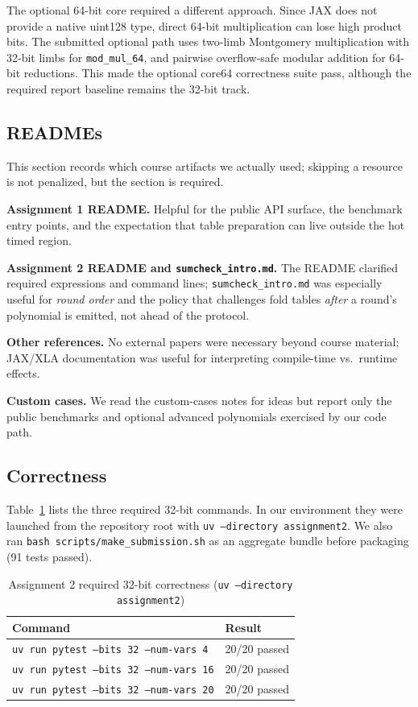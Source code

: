 \documentclass[conference]{IEEEtran}
\begin{document}
The optional 64-bit core required a different approach. Since JAX does not
provide a native uint128 type, direct 64-bit multiplication can lose high
product bits. The submitted optional path uses two-limb Montgomery
multiplication with 32-bit limbs for \texttt{mod\_mul\_64}, and pairwise
overflow-safe modular addition for 64-bit reductions. This made the optional
core64 correctness suite pass, although the required report baseline remains
the 32-bit track.

\subsection{READMEs}
This section records which course artifacts we actually used; skipping a
resource is not penalized, but the section is required.

\textbf{Assignment 1 README.} Helpful for the public API surface, the benchmark
entry points, and the expectation that table preparation can live outside the
hot timed region.

\textbf{Assignment 2 README and \texttt{sumcheck\_intro.md}.} The README
clarified required expressions and command lines; \texttt{sumcheck\_intro.md}
was especially useful for \emph{round order} and the policy that challenges
fold tables \emph{after} a round's polynomial is emitted, not ahead of the
protocol.

\textbf{Other references.} No external papers were necessary beyond course
material; JAX/XLA documentation was useful for interpreting compile-time vs.\
runtime effects.

\textbf{Custom cases.} We read the custom-cases notes for ideas but report only
the public benchmarks and optional advanced polynomials exercised by our code
path.

\subsection{Correctness}
Table~\ref{tab:a2-correctness} lists the three required 32-bit commands. In our
environment they were launched from the repository root with
\texttt{uv --directory assignment2}. We also ran \texttt{bash scripts/make\_submission.sh}
as an aggregate bundle before packaging (91 tests passed).

\begin{table}[htbp]
\caption{Assignment 2 required 32-bit correctness (\texttt{uv --directory assignment2})}
\label{tab:a2-correctness}
\centering
\footnotesize
\setlength{\tabcolsep}{4pt}
\begin{tabularx}{\columnwidth}{@{}>{\raggedright\arraybackslash}X l@{}}
\toprule
Command & Result \\
\midrule
\texttt{uv run pytest --bits 32 --num-vars 4} & 20/20 passed \\
\texttt{uv run pytest --bits 32 --num-vars 16} & 20/20 passed \\
\texttt{uv run pytest --bits 32 --num-vars 20} & 20/20 passed \\
\bottomrule
\end{tabularx}
\end{table}
\end{document}

